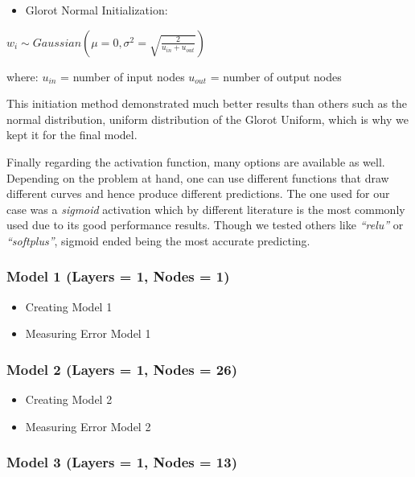 \documentclass[
  paper=a4,
  ,captions=tableheading
]{scrartcl}
\providecommand{\tightlist}{%
  \setlength{\itemsep}{0pt}\setlength{\parskip}{0pt}}
\begin{document}
\begin{itemize}
\tightlist
\item
  Glorot Normal Initialization:
\end{itemize}

\(w_{i} \sim Gaussian(\mu = 0, \sigma^{2} = \sqrt{\frac{2} {u_{in} + u_{out} }})\)

where: \(u_{in}\) = number of input nodes \(u_{out}\) = number of output
nodes

This initiation method demonstrated much better results than others such
as the normal distribution, uniform distribution of the Glorot Uniform,
which is why we kept it for the final model.

Finally regarding the activation function, many options are available as
well. Depending on the problem at hand, one can use different functions
that draw different curves and hence produce different predictions. The
one used for our case was a \emph{sigmoid} activation which by different
literature is the most commonly used due to its good performance
results. Though we tested others like \emph{``relu''} or
\emph{``softplus''}, sigmoid ended being the most accurate predicting.

\hypertarget{model-1-layers-1-nodes-1}{%
\subsubsection{Model 1 (Layers = 1, Nodes =
1)}\label{model-1-layers-1-nodes-1}}

\begin{itemize}
\item
  Creating Model 1
\item
  Measuring Error Model 1
\end{itemize}

\hypertarget{model-2-layers-1-nodes-26}{%
\subsubsection{Model 2 (Layers = 1, Nodes =
26)}\label{model-2-layers-1-nodes-26}}

\begin{itemize}
\item
  Creating Model 2
\item
  Measuring Error Model 2
\end{itemize}

\hypertarget{model-3-layers-1-nodes-13}{%
\subsubsection{Model 3 (Layers = 1, Nodes =
13)}\label{model-3-layers-1-nodes-13}}
\end{document}
